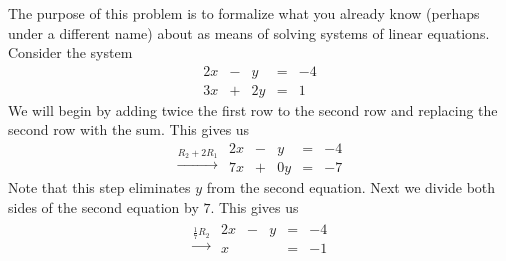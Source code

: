 \documentclass{ximera}
\begin{document}
\begin{exploration}\label{init:systwoeqs1} The purpose of this problem is to formalize what you already know (perhaps under a different name) about  as means of solving systems of linear equations.  Consider the system
\begin{equation}\label{eq:step1}
\begin{array}{ccccc}
      2x& -&y&=&-4\\
      3x & +&2y&= &1 
    \end{array}
\end{equation}
We will begin by adding twice the first row to the second row and replacing the second row with the sum.  This gives us
\begin{equation}\label{eq:step2}
\begin{array}{c}
\\
 \xrightarrow{R_2+2R_1}\\
 \end{array}
 \begin{array}{ccccc}
      2x& -&y&=&-4\\
      7x & +&0y&= &-7  
    \end{array}
\end{equation}
Note that this step eliminates $y$ from the second equation.  Next we divide both sides of the second equation by $7$.  This gives us
\begin{equation}\label{eq:step3}
\begin{array}{c}
\\
 \xrightarrow{\frac{1}{7}R_2}\\
 \end{array}
 \begin{array}{ccccc}
      
      2x& -&y&=&-4\\
      x & &&= &-1
	 

\end{array}
\end{equation}
\end{exploration}
\end{document}
